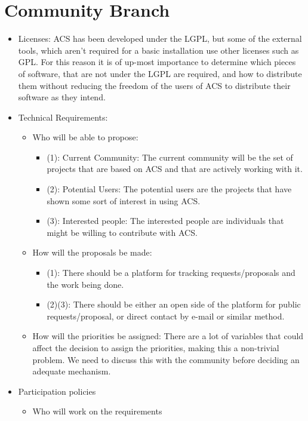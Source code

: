 \section{Community Branch}
\begin{itemize}
	\item Licenses: ACS has been developed under the LGPL, but some of the external tools, which aren't required for a basic installation use other licenses such as GPL. For this reason it is of up-most importance to determine which pieces of software, that are not under the LGPL are required, and how to distribute them without reducing the freedom of the users of ACS to distribute their software as they intend.
	\item Technical Requirements:
		\begin{itemize}
			\item Who will be able to propose:
			\begin{itemize}
				\item (1): Current Community: The current community will be the set of projects that are based on ACS and that are 
				actively working with it.
				\item (2): Potential Users: The potential users are the projects that have shown some sort of interest in using ACS.
				\item (3): Interested people: The interested people are individuals that might be willing to contribute with ACS.
			\end{itemize}
			\item How will the proposals be made:
			\begin{itemize}
				\item (1): There should be a platform for tracking requests/proposals and the work being done.
				\item (2)(3): There should be either an open side of the platform for public requests/proposal, or direct contact 
					by e-mail or similar method. 
			\end{itemize}
			\item How will the priorities be assigned: There are a lot of variables that could affect the decision to assign the priorities, making this a non-trivial problem. We need to discuss this with the community before deciding an adequate mechanism.
		\end{itemize}
	\item Participation policies
		\begin{itemize}
			\item Who will work on the requirements

\end{itemize}
\end{itemize}

